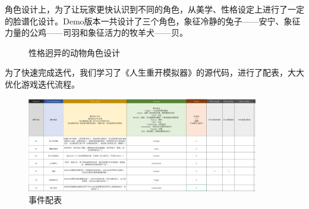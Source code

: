 角色设计上，为了让玩家更快认识到不同的角色，从美学、性格设定上进行了一定的脸谱化设计。Demo版本一共设计了三个角色，象征冷静的兔子——安宁、象征力量的公鸡——司羽和象征活力的牧羊犬——贝。

\begin{figure}[H]
\centering  %
\caption{性格迥异的动物角色设计}
\end{figure}

为了快速完成迭代，我们学习了《人生重开模拟器》的源代码，进行了配表，大大优化游戏迭代流程。

\begin{figure}[H]
    \centering  %
    \includegraphics[width=0.9\textwidth]{Images/信存者/table_event.png}
    \caption{事件配表}
\end{figure}




